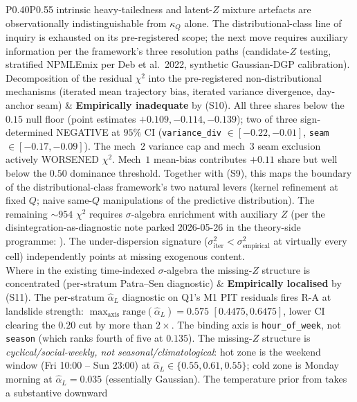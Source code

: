 \documentclass[11pt]{article}
\theoremstyle{definition}
\theoremstyle{plain}
\begin{document}
\begin{longtable}{P{0.40\textwidth}P{0.55\textwidth}}
intrinsic heavy-tailedness and latent-$Z$ mixture artefacts are
observationally indistinguishable from $\kappa_{Q}$ alone. The
distributional-class line of inquiry is exhausted on its
pre-registered scope; the next move requires auxiliary information
per the framework's three resolution paths (candidate-$Z$ testing,
stratified NPMLEmix per Deb et al.\ 2022, synthetic Gaussian-DGP
calibration). \\
\addlinespace
Decomposition of the residual $\chi^{2}$ into the pre-registered
non-distributional mechanisms (iterated mean trajectory bias,
iterated variance divergence, day-anchor seam)
& \textbf{Empirically inadequate} by (S10). All three shares below
the $0.15$ null floor (point estimates $+0.109, -0.114, -0.139$);
two of three sign-determined NEGATIVE at $95\%$ CI (\texttt{variance\_div}
$\in [-0.22, -0.01]$, \texttt{seam} $\in [-0.17, -0.09]$). The
mech~$2$ variance cap and mech~$3$ seam exclusion actively WORSENED
$\chi^{2}$. Mech~$1$ mean-bias contributes $+0.11$ share but well
below the $0.50$ dominance threshold. Together with (S9), this
maps the boundary of the distributional-class framework's two
natural levers (kernel refinement at fixed $Q$; naive same-$Q$
manipulations of the predictive distribution). The remaining
$\sim 954$ $\chi^{2}$ requires $\sigma$-algebra enrichment with
auxiliary $Z$ (per the disintegration-as-diagnostic note parked
2026-05-26 in the theory-side programme:
).
The under-dispersion signature ($\sigma^{2}_{\mathrm{iter}} <
\sigma^{2}_{\mathrm{empirical}}$ at virtually every cell)
independently points at missing exogenous content. \\
\addlinespace
Where in the existing time-indexed $\sigma$-algebra the missing-$Z$
structure is concentrated (per-stratum Patra--Sen diagnostic)
& \textbf{Empirically localised} by (S11). The per-stratum
$\hat\alpha_L$ diagnostic on Q1's M1 PIT residuals fires R-A at
landslide strength: $\max_{\mathrm{axis}} \mathrm{range}(\hat\alpha_L)
= 0.575$ $[0.4475, 0.6475]$, lower CI clearing the $0.20$ cut by
more than $2\times$. The binding axis is \texttt{hour\_of\_week},
not \texttt{season} (which ranks fourth of five at $0.135$). The
missing-$Z$ structure is \emph{cyclical/social-weekly, not
seasonal/climatological}: hot zone is the weekend window (Fri
10:00 -- Sun 23:00) at $\hat\alpha_L \in \{0.55, 0.61, 0.55\}$;
cold zone is Monday morning at $\hat\alpha_L = 0.035$ (essentially
Gaussian). The temperature prior from
 takes a substantive downward

\end{longtable}
\end{document}
